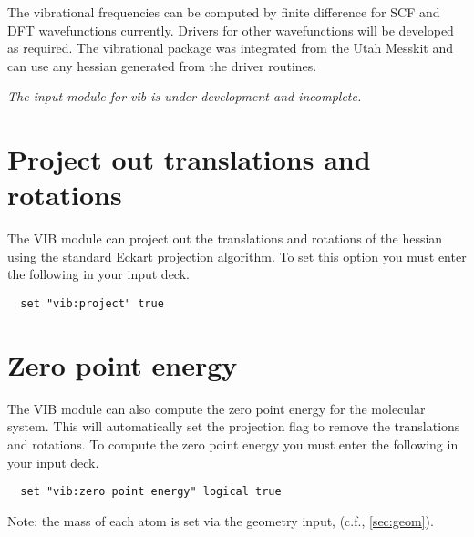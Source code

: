 The vibrational frequencies can be computed by finite difference for
SCF and DFT wavefunctions currently.  Drivers for other wavefunctions
will be developed as required.  The vibrational package was integrated
from the Utah Messkit and can use any hessian generated from the
driver routines.

{\it The input module for vib is under development and incomplete.}

\section{Project out translations and rotations}

The VIB module can project out the translations and rotations of the
hessian using the standard Eckart projection algorithm.  To set this
option you must enter the following in your input deck.

\begin{verbatim}
  set "vib:project" true
\end{verbatim}

\section{Zero point energy}

The VIB module can also compute the zero point energy for the
molecular system.  This will automatically set the projection flag to
remove the translations and rotations.   To compute the zero point energy
you must enter the following in your input deck.

\begin{verbatim}
  set "vib:zero point energy" logical true
\end{verbatim}

Note: the mass of each atom is set via the geometry input, (c.f.,
\ref{sec:geom}). 
